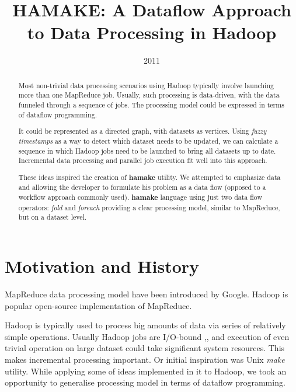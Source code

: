 \documentclass[10pt,conference,letterpaper]{IEEEtran}
\title{HAMAKE: A Dataflow Approach to Data Processing in Hadoop}
\author{\IEEEauthorblockN{Vadim Zaliva}
\IEEEauthorblockA{Codeminders\\
Email: lord@crocodile.org} \and \IEEEauthorblockN{Vladimir Orlov}
\IEEEauthorblockA{Codeminders\\
Email: vorl@codeminders.com}}
\date{2011}
\begin{document}
\lstset{language=XML,basicstyle=\tiny,markfirstintag=true,numbers=left,numbersep=1pt}

\maketitle

\begin{abstract}
  Most non-trivial data processing scenarios using Hadoop typically
  involve launching more than one MapReduce job. Usually, such
  processing is data-driven, with the data funneled through a sequence
  of jobs. The processing model could be expressed in terms of
  dataflow programming.
  
  It could be represented as a directed graph, with datasets as
  vertices. Using \textit{fuzzy timestamps} as a way to detect which
  dataset needs to be updated, we can calculate a sequence in which
  Hadoop jobs need to be launched to bring all datasets up to
  date. Incremental data processing and parallel job execution fit
  well into this approach.

  These ideas inspired the creation of \textbf{hamake} utility. We
  attempted to emphasize data and allowing the developer to formulate
  his problem as a data flow (opposed to a workflow approach commonly
  used). \textbf{hamake} language using just two data flow operators:
  \emph{fold} and \emph{foreach} providing a clear processing model,
  similar to MapReduce, but on a dataset level.
\end{abstract}

\section{Motivation and History}

MapReduce data processing model have been introduced by
Google\cite{dean2008map}. Hadoop\cite{bialecki2005hadoop} is popular
open-source implementation of MapReduce.

Hadoop is typically used to process big amounts of data via series of
relatively simple operations. Usually Hadoop jobs are I/O-bound
\cite{hadoopattwitter},\cite{hs2010hadoopbench}, and execution of even
trivial operation on large dataset could take significant system
resources. This makes incremental processing important. Or initial
inspiration was Unix \emph{make} utility. While applying some of ideas
implemented in it to Hadoop, we took an opportunity to generalise
processing model in terms of dataflow programming.
\end{document}
